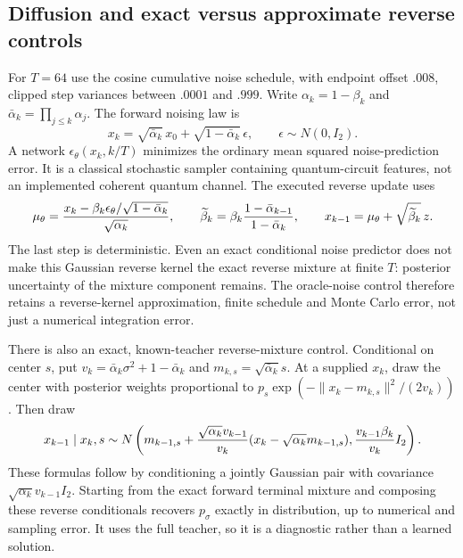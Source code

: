 \documentclass[11pt]{article}
\theoremstyle{definition}\newtheorem{definition}[theorem]{Definition}
\theoremstyle{remark}\newtheorem{remark}[theorem]{Remark}
\begin{document}
\subsection{Diffusion and exact versus approximate reverse controls}
For $T=64$ use the cosine cumulative noise schedule, with endpoint offset
$.008$, clipped step variances between $.0001$ and $.999$.
Write $\alpha_k=1-\beta_k$ and $\bar\alpha_k=\prod_{j\leq k}\alpha_j$.
The forward noising law is
\[
 x_k=\sqrt{\bar\alpha_k}\,x_0+
       \sqrt{1-\bar\alpha_k}\,\epsilon,\qquad\epsilon\sim N(0,I_2).
\]
A network $\epsilon_\theta(x_k,k/T)$ minimizes the ordinary mean squared
noise-prediction error. It is a classical stochastic sampler containing
quantum-circuit features, not an implemented coherent quantum channel.
The executed reverse update uses
\[
 \mu_\theta={x_k-\beta_k\epsilon_\theta/
       \sqrt{1-\bar\alpha_k}\over\sqrt{\alpha_k}},\qquad
 \widetilde\beta_k=\beta_k{1-\bar\alpha_{k-1}\over1-\bar\alpha_k},
 \qquad x_{k-1}=\mu_\theta+\sqrt{\widetilde\beta_k}\,z.
\]
The last step is deterministic. Even an exact conditional noise predictor
does not make this Gaussian reverse kernel the exact reverse mixture at
finite $T$: posterior uncertainty of the mixture component remains.
The oracle-noise control therefore retains a reverse-kernel approximation,
finite schedule and Monte Carlo error, not just a numerical integration error.

There is also an exact, known-teacher reverse-mixture control. Conditional
on center $s$, put
$v_k=\bar\alpha_k\sigma^2+1-\bar\alpha_k$ and
$m_{k,s}=\sqrt{\bar\alpha_k}s$. At a supplied $x_k$, draw the center with
posterior weights proportional to
$p_s\exp(-\|x_k-m_{k,s}\|^2/(2v_k))$. Then draw
\[
 x_{k-1}\mid x_k,s\sim N\left(
 m_{k-1,s}+{\sqrt{\alpha_k}v_{k-1}\over v_k}
                   (x_k-\sqrt{\alpha_k}m_{k-1,s}),
 {v_{k-1}\beta_k\over v_k}I_2\right).
\]
These formulas follow by conditioning a jointly Gaussian pair with
covariance $\sqrt{\alpha_k}v_{k-1}I_2$. Starting from the exact forward
terminal mixture and composing these reverse conditionals recovers
$p_\sigma$ exactly in distribution, up to numerical and sampling error.
It uses the full teacher, so it is a diagnostic rather than a learned solution.
\end{document}
